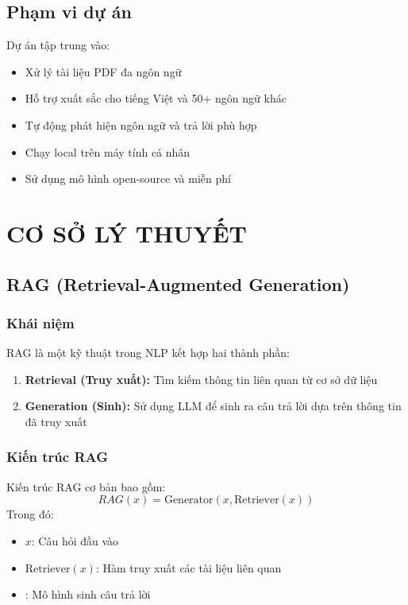 \documentclass[a4paper]{article}
\begin{document}
\subsection{Phạm vi dự án} %
Dự án tập trung vào: %
\begin{itemize}
    \item Xử lý tài liệu PDF đa ngôn ngữ %
    \item Hỗ trợ xuất sắc cho tiếng Việt và 50+ ngôn ngữ khác %
    \item Tự động phát hiện ngôn ngữ và trả lời phù hợp %
    \item Chạy local trên máy tính cá nhân %
    \item Sử dụng mô hình open-source và miễn phí %
\end{itemize}
\vfill
\section{CƠ SỞ LÝ THUYẾT} %

\subsection{RAG (Retrieval-Augmented Generation)} %
\subsubsection{Khái niệm} %
RAG là một kỹ thuật trong NLP kết hợp hai thành phần: %
\begin{enumerate}
    \item \textbf{Retrieval (Truy xuất):} Tìm kiếm thông tin liên quan từ cơ sở dữ liệu %
    \item \textbf{Generation (Sinh):} Sử dụng LLM để sinh ra câu trả lời dựa trên thông tin đã truy xuất %
\end{enumerate}

\subsubsection{Kiến trúc RAG} %
Kiến trúc RAG cơ bản bao gồm: %
\begin{equation}
    RAG(x) = \text{Generator}(x, \text{Retriever}(x)) %
\end{equation}
Trong đó: %
\begin{itemize}
    \item $x$: Câu hỏi đầu vào %
    \item $\text{Retriever}(x)$: Hàm truy xuất các tài liệu liên quan %
    \item {}: Mô hình sinh câu trả lời %
\end{itemize}
\end{document}
